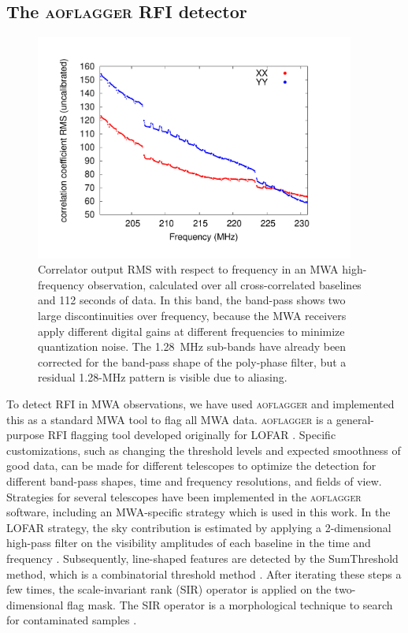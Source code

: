 \documentclass{pasa}
\newcommand{\editmark}[1]{{\color{red}{\textbf{#1}}}}
\begin{document}
\subsection{The \textsc{aoflagger} RFI detector}

\begin{figure}
\begin{center}\hspace*{-0.8cm}\includegraphics[width=10.5cm]{img/bandpass}
\caption{Correlator output RMS with respect to frequency in an MWA high-frequency observation, calculated over all cross-correlated baselines and 112 seconds of data. In this band, the band-pass shows two large discontinuities over frequency, because the MWA receivers apply different digital gains at different frequencies to minimize quantization noise. The 1.28~MHz sub-bands have already been corrected for the band-pass shape of the poly-phase filter, but a residual 1.28-MHz pattern is visible due to aliasing.
}
\label{fig:bandpass}
\end{center}
\end{figure}

To detect RFI in MWA observations, we have used \textsc{aoflagger} and implemented this as a standard MWA tool to flag all MWA data. \textsc{aoflagger} is a general-purpose RFI flagging tool developed originally for LOFAR \citep{lofar-radio-environment}. Specific customizations, such as changing the threshold levels and expected smoothness of good data, can be made for different telescopes to optimize the detection \editmark{accuracy} for different band-pass shapes, time and frequency resolutions, and fields of view. Strategies for several telescopes have been implemented in the \textsc{aoflagger} software, including an MWA-specific strategy which is used in this work. In the LOFAR strategy, the sky contribution is estimated by applying a 2-dimensional high-pass filter on the visibility amplitudes of each baseline in the time and frequency \editmark{domains}. Subsequently, line-shaped features are detected by the SumThreshold method, which is a combinatorial threshold method \citep{post-correlation-rfi-classification}. After iterating these steps a few times, the scale-invariant rank (SIR) operator is applied on the two-dimensional flag mask. The SIR operator is a morphological technique to search for contaminated samples \citep{scale-invariant-rank-operator}.
\end{document}

